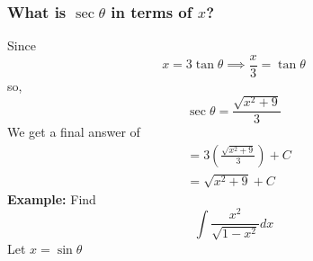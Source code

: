 \documentclass[10pt]{article}
\theoremstyle{break}
\begin{document}
\subsubsection{What is $\sec \theta$ in terms of $x$?}
Since $$x = 3 \tan \theta \implies \frac{x}{3} = \tan \theta$$
so, $$\sec \theta = \frac{\sqrt{x^2 + 9}}{3}$$
We get a final answer of 
\begin{align*}
  &= 3 \left(\frac{\sqrt{x^2 + 9}}{3}\right) + C\\
  &= \sqrt{x^2 + 9} + C
\end{align*}
\textbf{Example:} Find\\
$$\int \dfrac{x^2}{\sqrt{1 - x^2}} dx$$
Let $x = \sin \theta$
\end{document}
